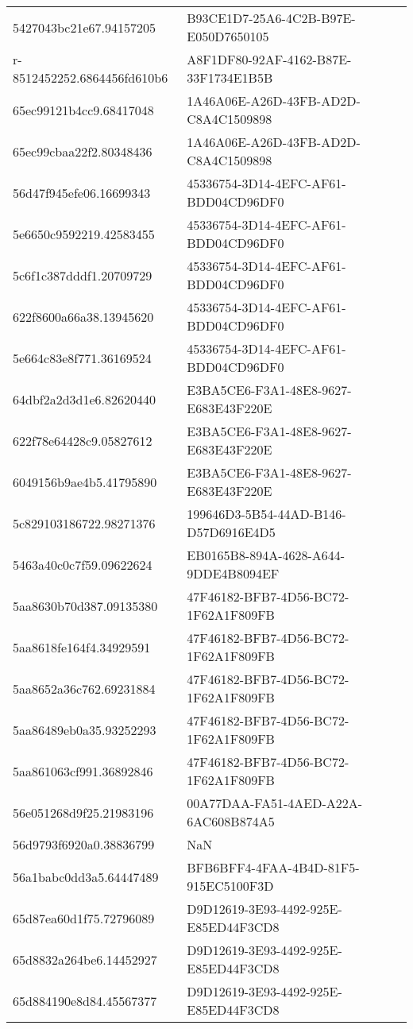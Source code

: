 \begin{tabular}{ll}
5427043bc21e67.94157205 & B93CE1D7-25A6-4C2B-B97E-E050D7650105 \\
r-8512452252.6864456fd610b6 & A8F1DF80-92AF-4162-B87E-33F1734E1B5B \\
65ec99121b4cc9.68417048 & 1A46A06E-A26D-43FB-AD2D-C8A4C1509898 \\
65ec99cbaa22f2.80348436 & 1A46A06E-A26D-43FB-AD2D-C8A4C1509898 \\
56d47f945efe06.16699343 & 45336754-3D14-4EFC-AF61-BDD04CD96DF0 \\
5e6650c9592219.42583455 & 45336754-3D14-4EFC-AF61-BDD04CD96DF0 \\
5c6f1c387dddf1.20709729 & 45336754-3D14-4EFC-AF61-BDD04CD96DF0 \\
622f8600a66a38.13945620 & 45336754-3D14-4EFC-AF61-BDD04CD96DF0 \\
5e664c83e8f771.36169524 & 45336754-3D14-4EFC-AF61-BDD04CD96DF0 \\
64dbf2a2d3d1e6.82620440 & E3BA5CE6-F3A1-48E8-9627-E683E43F220E \\
622f78e64428c9.05827612 & E3BA5CE6-F3A1-48E8-9627-E683E43F220E \\
6049156b9ae4b5.41795890 & E3BA5CE6-F3A1-48E8-9627-E683E43F220E \\
5c829103186722.98271376 & 199646D3-5B54-44AD-B146-D57D6916E4D5 \\
5463a40c0c7f59.09622624 & EB0165B8-894A-4628-A644-9DDE4B8094EF \\
5aa8630b70d387.09135380 & 47F46182-BFB7-4D56-BC72-1F62A1F809FB \\
5aa8618fe164f4.34929591 & 47F46182-BFB7-4D56-BC72-1F62A1F809FB \\
5aa8652a36c762.69231884 & 47F46182-BFB7-4D56-BC72-1F62A1F809FB \\
5aa86489eb0a35.93252293 & 47F46182-BFB7-4D56-BC72-1F62A1F809FB \\
5aa861063cf991.36892846 & 47F46182-BFB7-4D56-BC72-1F62A1F809FB \\
56e051268d9f25.21983196 & 00A77DAA-FA51-4AED-A22A-6AC608B874A5 \\
56d9793f6920a0.38836799 & NaN \\
56a1babc0dd3a5.64447489 & BFB6BFF4-4FAA-4B4D-81F5-915EC5100F3D \\
65d87ea60d1f75.72796089 & D9D12619-3E93-4492-925E-E85ED44F3CD8 \\
65d8832a264be6.14452927 & D9D12619-3E93-4492-925E-E85ED44F3CD8 \\
65d884190e8d84.45567377 & D9D12619-3E93-4492-925E-E85ED44F3CD8 \\

\end{tabular}
